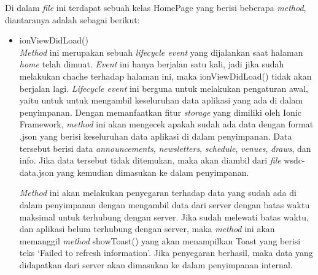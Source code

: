\begin{enumerate}
	Di dalam \textit{file} ini terdapat sebuah kelas HomePage yang berisi beberapa \textit{method}, diantaranya adalah sebagai berikut:
	
	\begin{itemize}
		\item ionViewDidLoad() \\
		\textit{Method} ini merupakan sebuah \textit{lifecycle event} yang dijalankan saat halaman \textit{home} telah dimuat. \textit{Event} ini hanya berjalan satu kali, jadi jika sudah melakukan chache terhadap halaman ini, maka ionViewDidLoad() tidak akan berjalan lagi. \textit{Lifecycle event} ini berguna untuk melakukan pengaturan awal, yaitu untuk untuk mengambil keseluruhan data aplikasi yang ada di dalam penyimpanan. Dengan memanfaatkan fitur \textit{storage} yang dimiliki oleh Ionic Framework, \textit{method} ini akan mengecek apakah sudah ada data dengan format .json yang berisi keseluruhan data aplikasi di dalam penyimpanan. Data tersebut berisi data \textit{announcements}, \textit{newsletters}, \textit{schedule}, \textit{venues}, \textit{draws}, dan info. Jika data tersebut tidak ditemukan, maka akan diambil dari \textit{file} wsdc-data.json yang kemudian dimasukan ke dalam penyimpanan.

		\textit{Method} ini akan melakukan penyegaran terhadap data yang sudah ada di dalam penyimpanan dengan mengambil data dari server dengan batas waktu maksimal untuk terhubung dengan server. Jika sudah melewati batas waktu, dan aplikasi belum terhubung dengan server, maka \textit{method} ini akan memanggil \textit{method} showToast() yang akan menampilkan Toast yang berisi teks `Failed to refresh information'. Jika penyegaran berhasil, maka data yang didapatkan dari server akan dimasukan ke dalam penyimpanan internal.
	

\end{itemize}
\end{enumerate}
